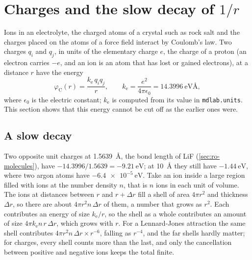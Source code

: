 \section{Charges and the slow decay of \texorpdfstring{$1/r$}{1/r}}
\label{sec:pe-coulomb}

Ions in an electrolyte, the charged atoms of a crystal such as rock salt
and the charges placed on the atoms of a force field interact by
Coulomb's law. Two charges
$q_i$ and $q_j$, in units of the elementary charge $e$, the charge of a
proton (an electron carries $-e$, and an ion is an atom that has lost or
gained electrons), at a distance $r$ have the energy
\begin{equation}
   \varphi_{\mathrm C}(r) = \frac{k_{\mathrm e}\,q_iq_j}{r} ,
   \qquad k_{\mathrm e} = \frac{e^2}{4\pi\epsilon_0} = \SI{14.3996}{\electronvolt
   \angstrom} ,
   \label{eq:pe-coulomb}
\end{equation}
where $\epsilon_0$ is the electric constant; $k_{\mathrm e}$ is computed from its
value in \texttt{mdlab.units}. This section shows that this energy cannot be
cut off as the earlier ones were.

\subsection*{A slow decay}

Two opposite unit charges at \SI{1.5639}{\angstrom}, the bond length of
LiF (\cref{sec:ro-molecules}), have $-14.3996/1.5639 =
\SI{-9.21}{\electronvolt}$; at \SI{10}{\angstrom} they still have
$\SI{-1.44}{\electronvolt}$, where two argon atoms have
$\SI{-6.4e-5}{\electronvolt}$. Take an ion inside a large region filled with ions at the number density
$n$, that is $n$ ions in each unit of volume. The ions at distances between $r$ and $r + \Delta r$ fill a
shell of area $4\pi r^2$ and thickness $\Delta r$, so there are about
$4\pi r^2n\,\Delta r$ of them, a number that grows as $r^2$. Each
contributes an energy of size $k_{\mathrm e}/r$, so the shell as a whole contributes
an amount of size $4\pi k_{\mathrm e}n\,r\,\Delta r$, which grows with $r$. For a
Lennard-Jones attraction the same shell contributes $4\pi r^2n\,\Delta
r\times r^{-6}$, falling as $r^{-4}$, and the far shells hardly matter;
for charges, every shell counts more than the last, and only the
cancellation between positive and negative ions keeps the total finite.

